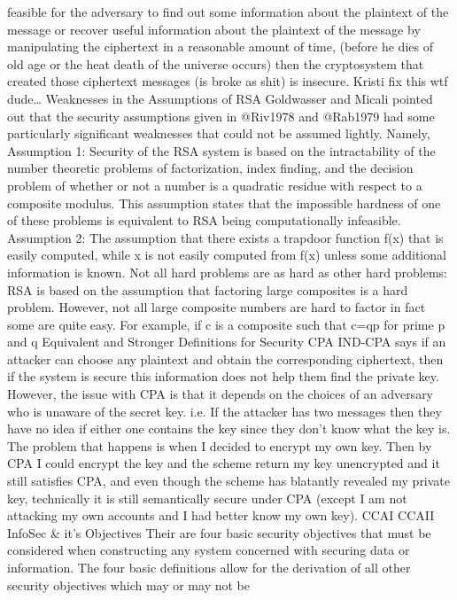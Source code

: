 feasible for the adversary to find out some information about the
plaintext of the message or recover useful information about the
plaintext of the message by manipulating the ciphertext in a reasonable
amount of time, (before he dies of old age or the heat death of the
universe occurs) then the cryptosystem that created those ciphertext
messages (is broke as shit) is insecure. Kristi fix this wtf dude…
Weaknesses in the Assumptions of RSA Goldwasser and Micali pointed out
that the security assumptions given in @Riv1978 and @Rab1979 had some
particularly significant weaknesses that could not be assumed lightly.
Namely, Assumption 1: Security of the RSA system is based on the
intractability of the number theoretic problems of factorization, index
finding, and the decision problem of whether or not a number is a
quadratic residue with respect to a composite modulus. This assumption
states that the impossible hardness of one of these problems is
equivalent to RSA being computationally infeasible. Assumption 2: The
assumption that there exists a trapdoor function f(x) that is easily
computed, while x is not easily computed from f(x) unless some
additional information is known. Not all hard problems are as hard as
other hard problems: RSA is based on the assumption that factoring
large composites is a hard problem. However, not all large composite
numbers are hard to factor in fact some are quite easy. For example, if
c is a composite such that c=qp for prime p and q Equivalent and
Stronger Definitions for Security CPA IND-CPA says if an attacker can
choose any plaintext and obtain the corresponding ciphertext, then if
the system is secure this information does not help them find the
private key. However, the issue with CPA is that it depends on the
choices of an adversary who is unaware of the secret key. i.e. If the
attacker has two messages then they have no idea if either one contains
the key since they don't know what the key is. The problem that happens
is when I decided to encrypt my own key. Then by CPA I could encrypt
the key and the scheme return my key unencrypted and it still satisfies
CPA, and even though the scheme has blatantly revealed my private key,
technically it is still semantically secure under CPA (except I am not
attacking my own accounts and I had better know my own key). CCAI CCAII
InfoSec & it's Objectives Their are four basic security objectives that
must be considered when constructing any system concerned with securing
data or information. The four basic definitions allow for the
derivation of all other security objectives which may or may not be
